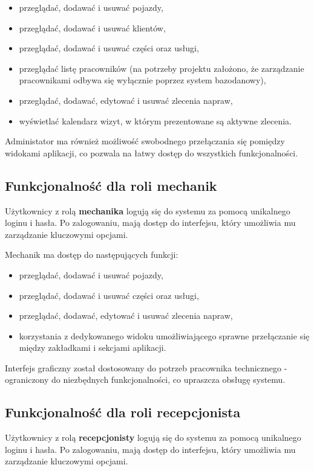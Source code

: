 \begin{itemize}
    \item przeglądać, dodawać i usuwać pojazdy,
    \item przeglądać, dodawać i usuwać klientów,
    \item przeglądać, dodawać i usuwać części oraz usługi,
    \item przeglądać listę pracowników (na potrzeby projektu założono, że zarządzanie pracownikami odbywa się wyłącznie poprzez system bazodanowy),
    \item przeglądać, dodawać, edytować i usuwać zlecenia napraw,
    \item wyświetlać kalendarz wizyt, w którym prezentowane są aktywne zlecenia.
\end{itemize}

Administator ma również możliwość swobodnego przełączania się pomiędzy widokami aplikacji, co pozwala na łatwy dostęp do wszystkich funkcjonalności.

\subsection{Funkcjonalność dla roli mechanik}
\label{sec:funkcjonalnoscMechanika}
Użytkownicy z rolą \textbf{mechanika} logują się do systemu za pomocą unikalnego loginu i hasła. Po zalogowaniu, mają dostęp do interfejsu, który umożliwia mu zarządzanie kluczowymi opcjami.

Mechanik ma dostęp do następujących funkcji:
\begin{itemize}
    \item przeglądać, dodawać i usuwać pojazdy,
    \item przeglądać, dodawać i usuwać części oraz usługi,
    \item przeglądać, dodawać, edytować i usuwać zlecenia napraw,
    \item korzystania z dedykowanego widoku umożliwiającego sprawne przełączanie się między zakładkami i sekcjami aplikacji.
\end{itemize}

Interfejs graficzny został dostosowany do potrzeb pracownika technicznego - ograniczony do niezbędnych funkcjonalności, co upraszcza obsługę systemu.

\subsection{Funkcjonalność dla roli recepcjonista}
\label{sec:funkcjonalnoscRecepcjonisty}
Użytkownicy z rolą \textbf{recepcjonisty} logują się do systemu za pomocą unikalnego loginu i hasła. Po zalogowaniu, mają dostęp do interfejsu, który umożliwia mu zarządzanie kluczowymi opcjami.


